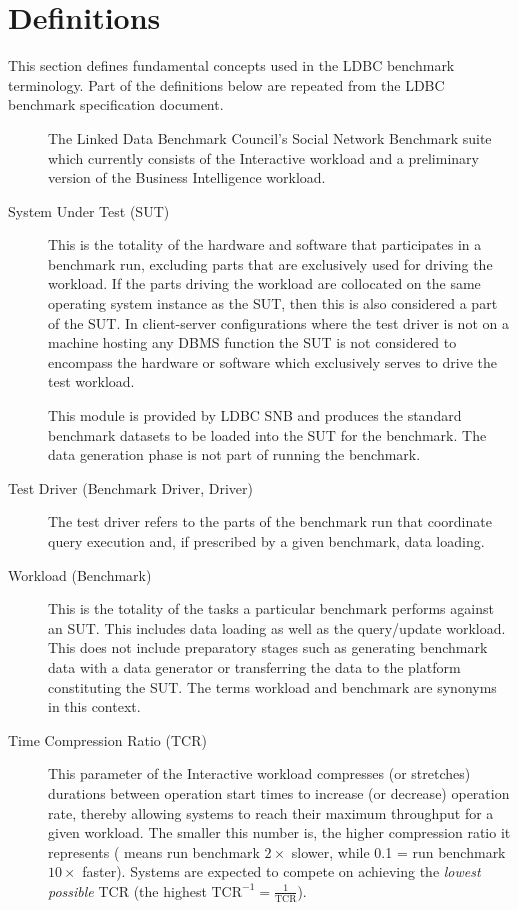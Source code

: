 \chapter*{Definitions}

This section defines fundamental concepts used in the LDBC benchmark terminology. Part of the definitions below are repeated from the LDBC benchmark specification document.

\begin{description}
    \item[\ldbcsnb] The Linked Data Benchmark Council's Social Network Benchmark suite which currently consists of the Interactive workload and a preliminary version of the Business Intelligence workload.
    
    \item[System Under Test (SUT)] This is the totality of the hardware and software that participates in a benchmark run, excluding parts that are exclusively used for driving the workload. If the parts driving the workload are collocated on the same operating system instance as the SUT, then this is also considered a part of the SUT. In client-server configurations where the test driver is not on a machine hosting any DBMS function the SUT is not considered to encompass the hardware or software which exclusively serves to drive the test workload.
    
    \item[\datagen] This module is provided by LDBC SNB and produces the standard benchmark datasets to be loaded into the SUT for the benchmark. The data generation phase is not part of running the benchmark.
 
    \item[Test Driver (Benchmark Driver, Driver)] The test driver refers to the parts of the benchmark run that coordinate query execution and, if prescribed by a given benchmark, data loading.
    
    \item[Workload (Benchmark)] This is the totality of the tasks a particular benchmark performs against an SUT. This includes data loading as well as the query/update workload. This does not include preparatory stages such as generating benchmark data with a data generator or transferring the data to the platform constituting the SUT. 
    The terms workload and benchmark are synonyms in this context. 

    \item[Time Compression Ratio (TCR)]
    This parameter of the Interactive workload compresses (or stretches) durations between operation start times to increase (or decrease) operation rate, thereby allowing systems to reach their maximum throughput for a given workload. The smaller this number is, the higher compression ratio it represents ( means run benchmark $2\times$ slower, while 0.1 = run benchmark $10\times$ faster). Systems are expected to compete on achieving the \emph{lowest possible} TCR (\ie the highest $\text{TCR}^{-1}=\frac{1}{\text{TCR}}$).
    

\end{description}
